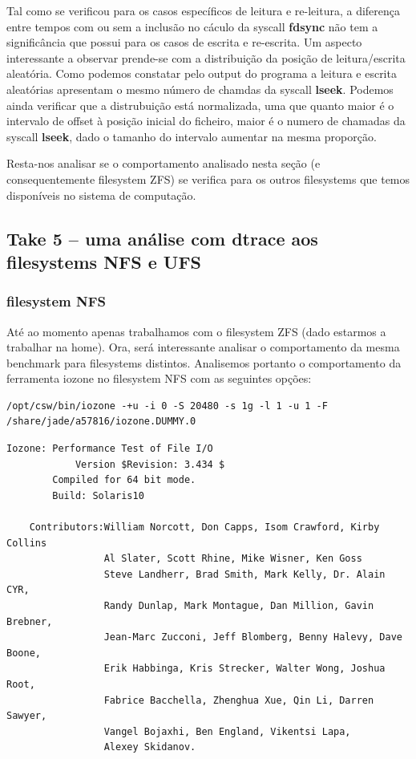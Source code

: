 \documentclass[a4paper]{article}
\begin{document}
{\begin{lstlisting}[style=command]
\end{lstlisting}

Tal como se verificou para  os casos específicos de leitura e re-leitura, a diferença entre tempos com ou sem a inclusão no cáculo da syscall \textbf{fdsync} não tem a significância que possui para os casos de escrita e re-escrita. 
Um aspecto interessante a observar prende-se com a distribuição da posição de leitura/escrita aleatória. Como podemos constatar pelo output do programa a leitura e escrita aleatórias apresentam o mesmo número de chamdas da syscall \textbf{lseek}. Podemos ainda verificar que a distrubuição está normalizada, uma que quanto maior é o intervalo de offset à posição inicial do ficheiro, maior é o numero de chamadas da syscall \textbf{lseek}, dado o tamanho do intervalo aumentar na mesma proporção.\par
Resta-nos analisar se o comportamento analisado nesta seção (e consequentemente filesystem ZFS) se verifica para os outros filesystems que temos disponíveis no sistema de computação.\par 


\subsection{Take 5 -- uma análise com dtrace aos filesystems NFS e UFS}
\subsubsection{filesystem NFS}
Até ao momento apenas trabalhamos com o filesystem ZFS (dado estarmos a trabalhar na home). Ora, será interessante analisar o comportamento da mesma benchmark para filesystems distintos.
Analisemos portanto o comportamento da ferramenta iozone no filesystem NFS com as seguintes opções:

\begin{lstlisting}[style=command]
/opt/csw/bin/iozone -+u -i 0 -S 20480 -s 1g -l 1 -u 1 -F /share/jade/a57816/iozone.DUMMY.0
\end{lstlisting}


\begin{lstlisting}[style=output]
	Iozone: Performance Test of File I/O
	        Version $Revision: 3.434 $
		Compiled for 64 bit mode.
		Build: Solaris10 

	Contributors:William Norcott, Don Capps, Isom Crawford, Kirby Collins
	             Al Slater, Scott Rhine, Mike Wisner, Ken Goss
	             Steve Landherr, Brad Smith, Mark Kelly, Dr. Alain CYR,
	             Randy Dunlap, Mark Montague, Dan Million, Gavin Brebner,
	             Jean-Marc Zucconi, Jeff Blomberg, Benny Halevy, Dave Boone,
	             Erik Habbinga, Kris Strecker, Walter Wong, Joshua Root,
	             Fabrice Bacchella, Zhenghua Xue, Qin Li, Darren Sawyer,
	             Vangel Bojaxhi, Ben England, Vikentsi Lapa,
	             Alexey Skidanov.


\end{lstlisting}}
\end{document}
